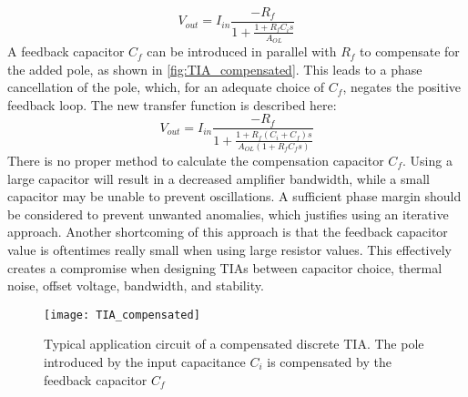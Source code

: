 \begin{equation}
V_{out}=I_{in} \frac{-R_f}{1+\frac{1+ R_f C_i s}{A_{OL}}}
\end{equation}
A feedback capacitor $C_f$ can be introduced in parallel with $R_f$ to compensate for the added pole, as shown in \autoref{fig:TIA_compensated}. This leads to a phase cancellation of the pole, which, for an adequate choice of $C_f$, negates the positive feedback loop. The new transfer function is described here: 
\begin{equation}
\label{eq:TIA_full}
V_{out}=I_{in} \frac{-R_f}{1+\frac{1+ R_f (C_i + C_f) s}{A_{OL} (1+ R_f C_f s)}}
\end{equation}
There is no proper method to calculate the compensation capacitor $C_f$. Using a large capacitor will result in a decreased amplifier bandwidth, while a small capacitor may be unable to prevent oscillations\cite{horowitz1989art}. A sufficient phase margin should be considered to prevent unwanted anomalies, which justifies using an iterative approach. Another shortcoming of this approach is that the feedback capacitor value is oftentimes really small when using large resistor values. This effectively creates a compromise when designing TIAs between capacitor choice, thermal noise, offset voltage, bandwidth, and stability. 
\begin{figure}[h]
    \centering
    \texttt{[image: TIA\_compensated]}
    \caption{Typical application circuit of a compensated discrete TIA. The pole introduced by the input capacitance $C_i$ is compensated by the feedback capacitor $C_f$}
    \label{fig:TIA_compensated}
\end{figure}